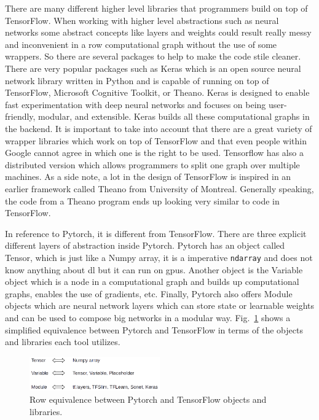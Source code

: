 \documentclass[11pt,a4paper]{article}
\begin{document}
There are many different higher level libraries that programmers build on top of TensorFlow. When working with higher level abstractions such as neural networks some abstract concepts like layers and weights could result really messy and inconvenient in a row computational graph without the use of some wrappers. So there are several packages to help to make the code stile cleaner. There are very popular packages such as Keras which is an open source neural network library written in Python and is capable of running on top of TensorFlow, Microsoft Cognitive Toolkit, or Theano. Keras is designed to enable fast experimentation with deep neural networks and focuses on being user-friendly, modular, and extensible. Keras builds all these computational graphs in the backend. It is important to take into account that there are a great variety of wrapper libraries which work on top of TensorFlow and that even people within Google cannot agree in which one is the right to be used. Tensorflow has also a distributed version which allows programmers to split one graph over multiple machines. As a side note, a lot in the design of TensorFlow is inspired in an earlier framework called Theano from University of Montreal. Generally speaking, the code from a Theano program ends up looking very similar to code in TensorFlow.

In reference to Pytorch, it is different from TensorFlow. There are three explicit different layers of abstraction inside Pytorch. Pytorch has an object called Tensor, which is just like a Numpy array, it is a imperative \texttt{ndarray} and does not know anything about \gls{dl} but it can run on \glspl{gpu}. Another object is the Variable object which is a node in a computational graph and builds up computational graphs, enables the use of gradients, etc. Finally, Pytorch also offers Module objects which are neural network layers which can store state or learnable weights and can be used to compose big networks in a modular way. Fig.~\ref{fig:Pytorch_TensorFlow} shows a simplified equivalence between Pytorch and TensorFlow in terms of the objects and libraries each tool utilizes.

\begin{figure}[h!]
    \centering
    \includegraphics[width=0.5\textwidth]{Pytorch_TensorFlow.png}
    \caption{Row equivalence between Pytorch and TensorFlow objects and libraries.}
    \label{fig:Pytorch_TensorFlow}
\end{figure}
\end{document}
